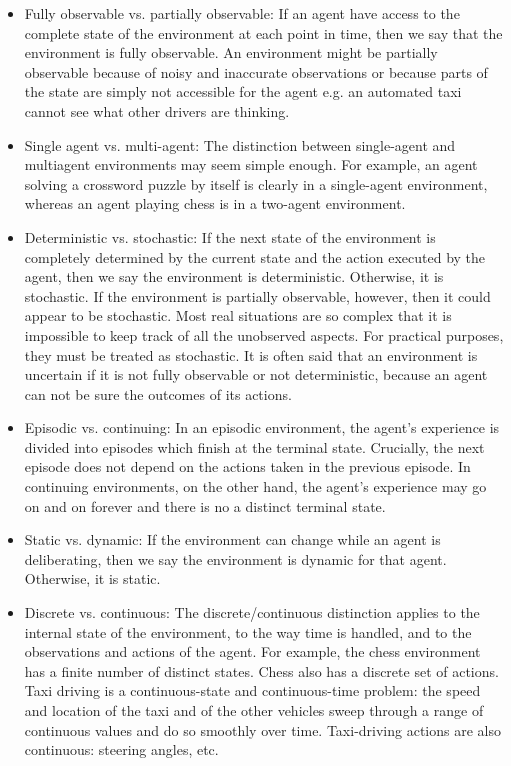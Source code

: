 \begin{itemize}
\item Fully observable vs. partially observable: If an agent have access to the complete state of the environment at each point in time, then we say that the environment is fully observable. An environment might be partially observable because of noisy and inaccurate observations or because parts of the state are simply not accessible for the agent e.g. an automated taxi cannot see what other drivers are thinking.
\item Single agent vs. multi-agent: The distinction between single-agent and multiagent environments may seem simple enough. For example, an agent solving a crossword puzzle by itself is clearly in a single-agent environment, whereas an agent playing chess is in a two-agent environment.
\item Deterministic vs. stochastic: If the next state of the environment is completely determined by the current state and the action executed by the agent, then we say the environment is deterministic. Otherwise, it is stochastic. If the environment is partially observable, however, then it could appear to be stochastic. Most real situations are so complex that it is impossible to keep track of all the unobserved aspects. For practical purposes, they must be treated as stochastic. It is often said that an environment is uncertain if it is not fully observable or not deterministic, because an agent can not be sure the outcomes of its actions.
\item Episodic vs. continuing: In an episodic environment, the agent’s experience is divided into episodes which finish at the terminal state. Crucially, the next episode does not depend on the actions taken in the previous episode. In continuing environments, on the other hand, the agent's experience may go on and on forever and there is no a distinct terminal state.
\item Static vs. dynamic: If the environment can change while an agent is deliberating, then we say the environment is dynamic for that agent. Otherwise, it is static.
\item Discrete vs. continuous: The discrete/continuous distinction applies to the internal state of the environment, to the way time is handled, and to the observations and actions of the agent. For example, the chess environment has a finite number of distinct states. Chess also has a discrete set of actions. Taxi driving is a continuous-state and continuous-time problem: the speed and location of the taxi and of the other vehicles sweep through a range of continuous values and do so smoothly over time. Taxi-driving actions are also continuous: steering angles, etc.

\end{itemize}
